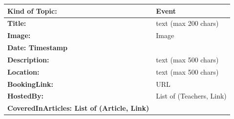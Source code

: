 \documentclass{article}
\begin{document}
\begin{center}
        \begin{tabularx}{\textwidth}{|>{\bfseries}l|X|}
                \hline
                Kind of Topic: & \textbf{Event} \\
                \hline
                Title: & text  (max 200 chars)\\
                \hline
                Image: & Image \\
                \hline
                Date: Timestamp \\
                \hline
                Description: & text (max 500 chars) \\
                \hline
                Location: & text (max 500 chars) \\
                \hline
                BookingLink: & URL \\
                \hline
                HostedBy: & List of {(Teachers, Link)} \\
                \hline
                CoveredInArticles: List of {(Article, Link)}\\
                \hline

        \end{tabularx}
        \caption{Table: Event}
\end{center}
\end{document}
